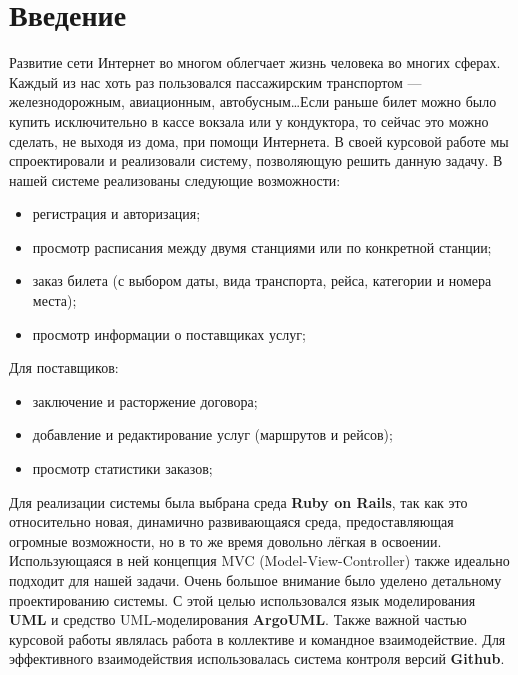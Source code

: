 \section{Введение}

Развитие сети Интернет во многом облегчает жизнь человека во многих сферах. Каждый из нас хоть раз пользовался пассажирским транспортом --- железнодорожным, авиационным, автобусным\ldots Если раньше билет можно было купить исключительно в кассе вокзала или у кондуктора, то сейчас это можно сделать, не выходя из дома, при помощи Интернета. В своей курсовой работе мы спроектировали и реализовали систему, позволяющую решить данную задачу.
В нашей системе реализованы следующие возможности:
\begin{itemize}
\item{регистрация и авторизация;}
\item{просмотр расписания между двумя станциями или по конкретной станции;}
\item{заказ билета (с выбором даты, вида транспорта, рейса, категории и номера места);}
\item{просмотр информации о поставщиках услуг;}
\end{itemize}
Для поставщиков:
\begin{itemize}
\item{заключение и расторжение договора;}
\item{добавление и редактирование услуг (маршрутов и рейсов);}
\item{просмотр статистики заказов;}
\end{itemize}

Для реализации системы была выбрана среда {\bf Ruby on Rails}, так как это относительно новая, динамично развивающаяся среда, предоставляющая огромные возможности, но в то же время довольно лёгкая в освоении. Использующаяся в ней концепция MVC (Model-View-Controller) также идеально подходит для нашей задачи. Очень большое внимание было уделено детальному проектированию системы. С этой целью использовался язык моделирования {\bf UML} и средство UML-моделирования {\bf ArgoUML}. Также важной частью курсовой работы являлась работа в коллективе и командное взаимодействие. Для эффективного взаимодействия использовалась система контроля версий {\bf Github}.

\endinput
